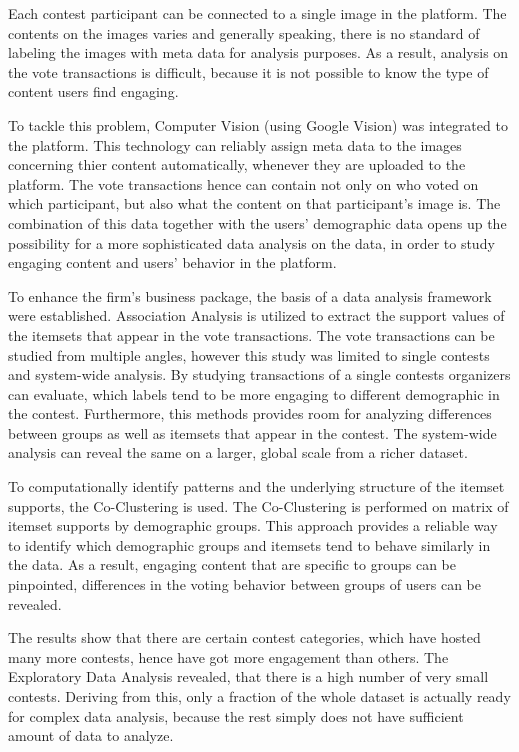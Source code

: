 Each contest participant can be connected to a single image in the platform. The contents on the images varies and generally speaking, there is no standard of labeling the images with meta data for analysis purposes. As a result, analysis on the vote transactions is difficult, because it is not possible to know the type of content users find engaging.

To tackle this problem, Computer Vision (using Google Vision) was integrated to the platform. This technology can reliably assign meta data to the images concerning thier content automatically, whenever they are uploaded to the platform. The vote transactions hence can contain not only on who voted on which participant, but also what the content on that participant's image is. The combination of this data together with the users' demographic data opens up the possibility for a more sophisticated data analysis on the data, in order to study engaging content and users' behavior in the platform. 

To enhance the firm's business package, the basis of a data analysis framework were established. Association Analysis is utilized to extract the support values of the itemsets that appear in the vote transactions. 
The vote transactions can be studied from multiple angles, however this study was limited to single contests and system-wide analysis. By studying transactions of a single contests organizers can evaluate, which labels tend to be more engaging to different demographic in the contest. Furthermore, this methods provides room for analyzing differences between groups as well as itemsets that appear in the contest. The system-wide analysis can reveal the same on a larger, global scale from a richer dataset. 

To computationally identify patterns and the underlying structure of the itemset supports, the Co-Clustering is used. The Co-Clustering is performed on matrix of itemset supports by demographic groups. This approach provides a reliable way to identify which demographic groups and itemsets tend to behave similarly in the data. As a result, engaging content that are specific to groups can be pinpointed, differences in the voting behavior between groups of users can be revealed. 

The results show that there are certain contest categories, which have hosted many more contests, hence have got more engagement than others. The Exploratory Data Analysis revealed, that there is a high number of very small contests. Deriving from this, only a fraction of the whole dataset is actually ready for complex data analysis, because the rest simply does not have sufficient amount of data to analyze. 

